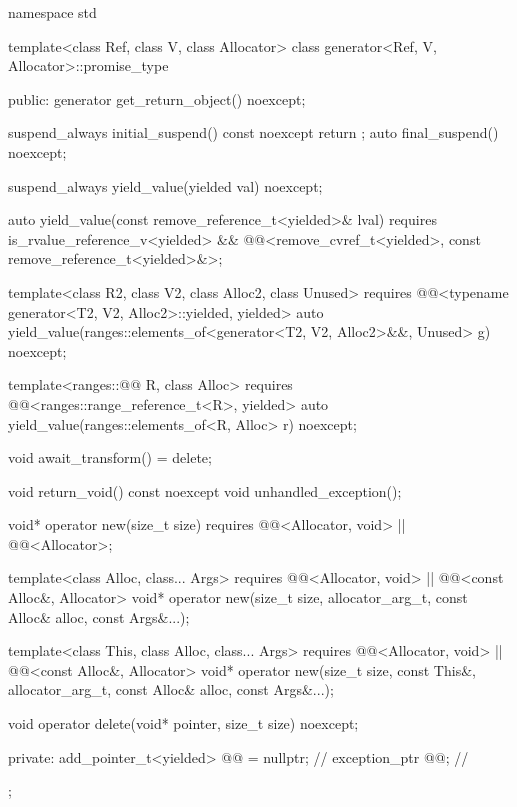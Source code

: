 \begin{codeblock}
namespace std {
  template<class Ref, class V, class Allocator>
  class generator<Ref, V, Allocator>::promise_type {
  public:
    generator get_return_object() noexcept;

    suspend_always initial_suspend() const noexcept { return {}; }
    auto final_suspend() noexcept;

    suspend_always yield_value(yielded val) noexcept;

    auto yield_value(const remove_reference_t<yielded>& lval)
      requires is_rvalue_reference_v<yielded> &&
        @@<remove_cvref_t<yielded>, const remove_reference_t<yielded>&>;

    template<class R2, class V2, class Alloc2, class Unused>
      requires @@<typename generator<T2, V2, Alloc2>::yielded, yielded>
      auto yield_value(ranges::elements_of<generator<T2, V2, Alloc2>&&, Unused> g) noexcept;

    template<ranges::@@ R, class Alloc>
      requires @@<ranges::range_reference_t<R>, yielded>
      auto yield_value(ranges::elements_of<R, Alloc> r) noexcept;

    void await_transform() = delete;

    void return_void() const noexcept {}
    void unhandled_exception();

    void* operator new(size_t size)
      requires @@<Allocator, void> || @@<Allocator>;

    template<class Alloc, class... Args>
      requires @@<Allocator, void> || @@<const Alloc&, Allocator>
      void* operator new(size_t size, allocator_arg_t, const Alloc& alloc, const Args&...);

    template<class This, class Alloc, class... Args>
      requires @@<Allocator, void> || @@<const Alloc&, Allocator>
      void* operator new(size_t size, const This&, allocator_arg_t, const Alloc& alloc,
                         const Args&...);

    void operator delete(void* pointer, size_t size) noexcept;

  private:
    add_pointer_t<yielded> @@ = nullptr;    // \expos
    exception_ptr @@;                      // \expos
  };
}
\end{codeblock}

